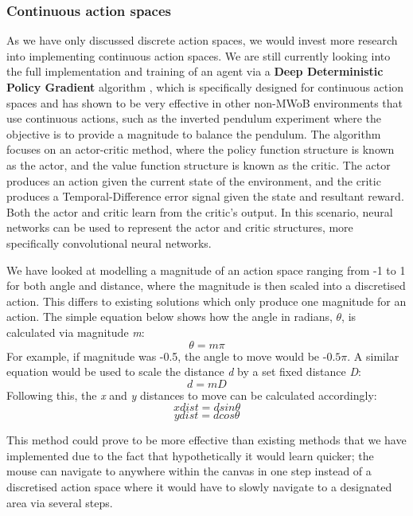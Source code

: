 \documentclass[10pt,journal,compsoc]{IEEEtran}
\begin{document}
\subsubsection{Continuous action spaces}
As we have only discussed discrete action spaces, we would invest more research into implementing continuous action spaces. We are still currently looking into the full implementation and training of an agent via a \textbf{Deep Deterministic Policy Gradient} algorithm \cite{lillicrap2015continuous}, which is specifically designed for continuous action spaces and has shown to be very effective in other non-MWoB environments that use continuous actions, such as the inverted pendulum experiment \cite{pendulum} where the objective is to provide a magnitude to balance the pendulum. The algorithm focuses on an actor-critic method, where the policy function structure is known as the actor, and the value function structure is known as the critic. The actor produces an action given the current state of the environment, and the critic produces a Temporal-Difference error signal given the state and resultant reward. Both the actor and critic learn from the critic's output. In this scenario, neural networks can be used to represent the actor and critic structures, more specifically convolutional neural networks.

We have looked at modelling a magnitude of an action space ranging from -1 to 1 for both angle and distance, where the magnitude is then scaled into a discretised action. This differs to existing solutions which only produce one magnitude for an action. The simple equation below shows how the angle in radians, \( \theta \), is calculated via magnitude \textit{m}:
\[ \theta=m\pi \]
For example, if magnitude was -0.5, the angle to move would be -\( 0.5\pi \). A similar equation would be used to scale the distance \textit{d} by a set fixed distance \textit{D}:
\[ d=mD \]
 Following this, the \textit{x} and \textit{y} distances to move can be calculated accordingly:
 \[ xdist=dsin\theta \]
 \[ ydist=dcos\theta \]
 
This method could prove to be more effective than existing methods that we have implemented due to the fact that hypothetically it would learn quicker; the mouse can navigate to anywhere within the canvas in one step instead of a discretised action space where it would have to slowly navigate to a designated area via several steps.
\end{document}
